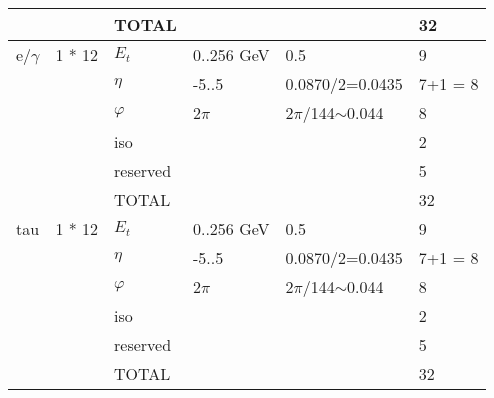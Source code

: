 \documentclass{cmspaper}
\begin{document}
\begin{table}[ht]
\begin{tabular}{| l | l | l | l | l | l |}
	&		&	TOTAL	&		&		&	32                    \\
\hline
e/$\gamma$	&	1 * 12	&	$E_t$	&	0..256 GeV	&	0.5	&	9                    \\
	&		&	$\eta$	&	-5..5	&	0.0870/2=0.0435	&	7+1 = 8                    \\
	&		&	$\varphi$	&	2$\pi$	&	2$\pi$/144$\sim$0.044	&	8                    \\
	&		&	iso	&		&		&	2                    \\
	&		&	reserved	&		&		&	5                    \\
	&		&	TOTAL	&		&		&	32                    \\
\hline
tau	&	1 * 12	&	$E_t$	&	0..256 GeV	&	0.5	&	9                    \\
	&		&	$\eta$	&	-5..5	&	0.0870/2=0.0435	&	7+1 = 8                    \\
	&		&	$\varphi$	&	2$\pi$	&	2$\pi$/144$\sim$0.044	&	8                    \\
	&		&	iso	&		&		&	2                    \\
	&		&	reserved	&		&		&	5                    \\
	&		&	TOTAL	&		&		&	32                    \\
\hline
\end{tabular}
\label{table:scales_table_1}
\end{table}
\end{document}
